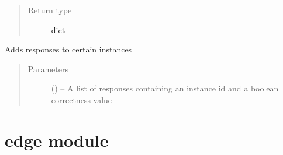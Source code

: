\documentclass[letterpaper,10pt,english]{sphinxmanual}
\begin{document}
\begin{fulllineitems}
\begin{fulllineitems}
\begin{quote}
\begin{description}
\item[{Return type}] \leavevmode
\href{https://docs.python.org/2/library/stdtypes.html\#dict}{dict}

\end{description}\end{quote}

\end{fulllineitems}


\begin{fulllineitems}
\label{\detokenize{consumer:consumer.Consumer.validate}}
Adds responses to certain instances
\begin{quote}\begin{description}
\item[{Parameters}] \leavevmode
{} (\href{https://docs.python.org/2/library/functions.html\#list}{}\sphinxstyleliteralemphasis{(}\href{https://docs.python.org/2/library/stdtypes.html\#dict}{}\sphinxstyleliteralemphasis{)}\sphinxstyleliteralemphasis{}) -- A list of responses containing an instance id and a boolean correctness value

\end{description}\end{quote}

\end{fulllineitems}


\end{fulllineitems}



\chapter{edge module}
\label{\detokenize{edge:module-edge}}\label{\detokenize{edge:edge-module}}\label{\detokenize{edge::doc}}
\end{document}
